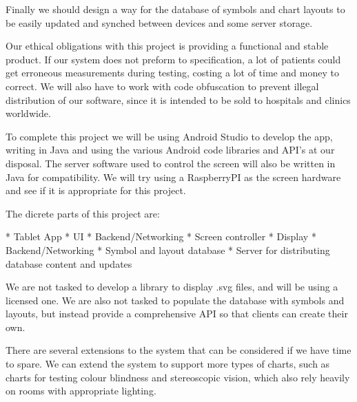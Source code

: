 \documentclass{article}
\begin{document}
Finally we should design a way for the database of symbols and chart layouts to be easily updated and synched between devices and some server storage. 


Our ethical obligations with this project is providing a functional and stable product. If our system does not preform to specification, a lot of patients could get erroneous measurements during testing, costing a lot of time and money to correct. We will also have to work with code obfuscation to prevent illegal distribution of our software, since it is intended to be sold to hospitals and clinics worldwide.




To complete this project we will be using Android Studio to develop the app, writing in Java and using the various Android code libraries and API's at our disposal. The server software used to control the screen will also be written in Java for compatibility. We will try using a RaspberryPI as the screen hardware and see if it is appropriate for this project.


The dicrete parts of this project are:

* Tablet App
	* UI
	* Backend/Networking
* Screen controller
	* Display
	* Backend/Networking
* Symbol and layout database
	* Server for distributing database content and updates



We are not tasked to develop a library to display .svg files, and will be using a licensed one. We are also not tasked to populate the database with symbols and layouts, but instead provide a comprehensive API so that clients can create their own.


There are several extensions to the system that can be considered if we have time to spare. We can extend the system to support more types of charts, such as charts for testing colour blindness and stereoscopic vision, which also rely heavily on rooms with appropriate lighting.
\end{document}
